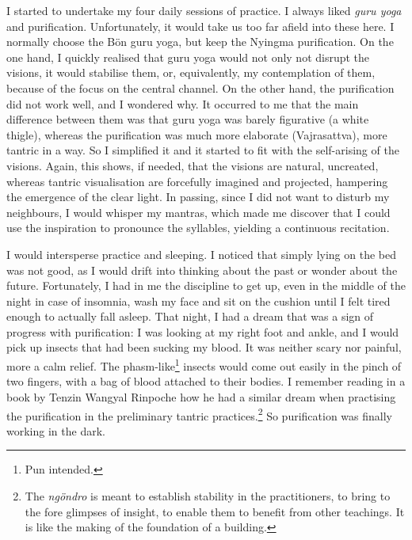 \documentclass[11pt,twocolumn]{article}
\begin{document}
I started to undertake my four daily sessions of practice. I always
liked \emph{guru yoga} and purification. Unfortunately, it would take
us too far afield into these here. I normally choose the Bön guru
yoga, but keep the Nyingma purification. On the one hand, I quickly
realised that guru yoga would not only not disrupt the visions, it
would stabilise them, or, equivalently, my contemplation of them,
because of the focus on the central channel. On the other hand, the
purification did not work well, and I wondered why. It occurred to me
that the main difference between them was that guru yoga was barely
figurative (a white thigle), whereas the purification was much more
elaborate (Vajrasattva), more tantric in a way. So I simplified it and
it started to fit with the self\hyp{}arising of the visions. Again,
this shows, if needed, that the visions are natural, uncreated,
whereas tantric visualisation are forcefully imagined and projected,
hampering the emergence of the clear light. In passing, since I did
not want to disturb my neighbours, I would whisper my mantras, which
made me discover that I could use the inspiration to pronounce the
syllables, yielding a continuous recitation.

I would intersperse practice and sleeping. I noticed that simply lying
on the bed was not good, as I would drift into thinking about the past
or wonder about the future. Fortunately, I had in me the discipline to
get up, even in the middle of the night in case of insomnia, wash my
face and sit on the cushion until I felt tired enough to actually fall
asleep. That night, I had a dream that was a sign of progress with
purification: I was looking at my right foot and ankle, and I would
pick up insects that had been sucking my blood. It was neither scary
nor painful, more a calm relief. The phasm\hyp{}like\footnote{Pun
intended.} insects would come out easily in the pinch of two fingers,
with a bag of blood attached to their bodies. I remember reading in a
book by Tenzin Wangyal Rinpoche how he had a similar dream when
practising the purification in the preliminary tantric
practices.\footnote{The \emph{ngöndro} is meant to establish stability
in the practitioners, to bring to the fore glimpses of insight, to
enable them to benefit from other teachings. It is like the making of
the foundation of a building.} So purification was finally working in
the dark.
\end{document}
